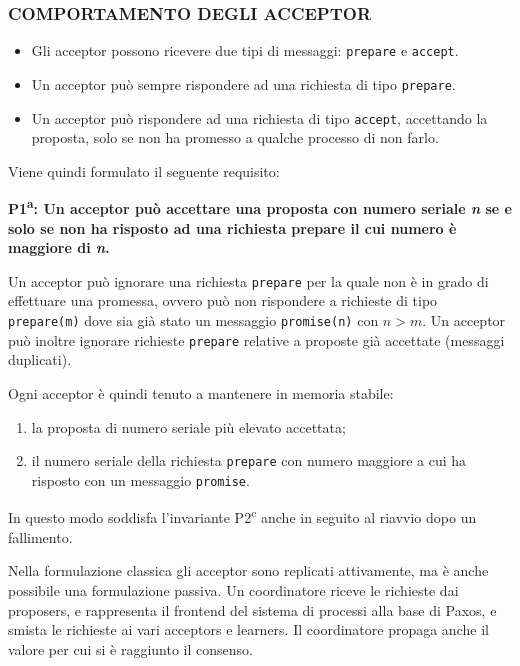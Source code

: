 \subsubsection{COMPORTAMENTO DEGLI ACCEPTOR}
\begin{itemize}
    \item Gli acceptor possono ricevere due tipi di messaggi: \texttt{prepare} e \texttt{accept}. 
    \item Un acceptor può sempre rispondere ad una richiesta di tipo \texttt{prepare}.
    \item Un acceptor può rispondere ad una richiesta di tipo \texttt{accept}, accettando la proposta, solo se non ha promesso a qualche processo di non farlo.
\end{itemize}
Viene quindi formulato il seguente requisito:

\noindent\textbf{P1\textsuperscript{a}: Un acceptor può accettare una proposta con numero seriale \textit{n} se e solo se non ha risposto ad una richiesta prepare il cui numero è maggiore di \textit{n}.}

Un acceptor può ignorare una richiesta \texttt{prepare} per la quale non è in grado di effettuare una promessa, ovvero può non rispondere a richieste di tipo \texttt{prepare(m)} dove sia già stato un messaggio \texttt{promise(n)} con $n > m$. Un acceptor può inoltre ignorare richieste \texttt{prepare} relative a proposte già accettate (messaggi duplicati).

\vspace{5mm}

Ogni acceptor è quindi tenuto a mantenere in memoria stabile:
\begin{enumerate}
    \item la proposta di numero seriale più elevato accettata;
    \item il numero seriale della richiesta \texttt{prepare} con numero maggiore a cui ha risposto con un messaggio \texttt{promise}.
\end{enumerate}
In questo modo soddisfa l'invariante P2\textsuperscript{c} anche in seguito al riavvio dopo un fallimento.

Nella formulazione classica gli acceptor sono replicati attivamente, ma è anche possibile una formulazione passiva. Un coordinatore riceve le richieste dai proposers, e rappresenta il frontend del sistema di processi alla base di Paxos, e smista le richieste ai vari acceptors e learners. Il coordinatore propaga anche il valore per cui si è raggiunto il consenso.

